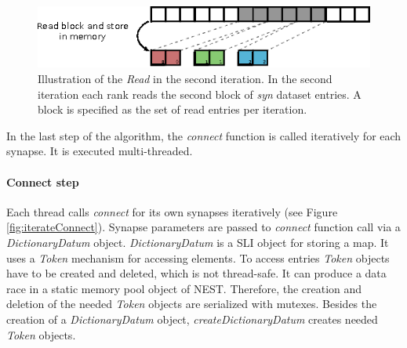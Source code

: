 \begin{figure}[ht!]
\centering
\includegraphics[scale=2.0]{pictures/import_syn_vis_second_it.eps}
\caption[Illustration of the \emph{Read} in the second iteration]{Illustration of the \emph{Read} in the second iteration.
In the second iteration each rank reads the second block of \emph{syn} dataset entries.
A block is specified as the set of read entries per iteration.}
\label{fig:importsynvis2nd}
\end{figure}
\newpage
In the last step of the algorithm, the \emph{connect} function is called iteratively for each synapse.
It is executed multi-threaded.

\paragraph{Connect step}
Each thread calls \emph{connect} for its own synapses iteratively (see Figure \ref{fig:iterateConnect}).
Synapse parameters are passed to \emph{connect} function call via a \emph{DictionaryDatum} object.
\emph{DictionaryDatum} is a SLI object for storing a map.
It uses a \emph{Token} mechanism for accessing elements.
To access entries \emph{Token} objects have to be created and deleted,
which is not thread-safe. It can produce a data race in a static memory pool object of NEST.
Therefore, the creation and deletion of the needed \emph{Token} objects are serialized with mutexes.
Besides the creation of a \emph{DictionaryDatum} object, \emph{createDictionaryDatum} creates needed \emph{Token} objects.


